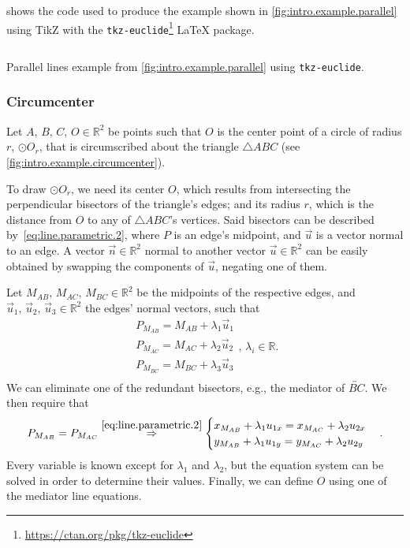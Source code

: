  shows the code used to produce the
example shown in \cref{fig:intro.example.parallel} using \acs{TikZ} with the
\texttt{tkz-euclide}\footnote{\url{https://ctan.org/pkg/tkz-euclide}} \LaTeX{}
package.

\begin{listing}[htb]
  \inputminted{latex}{tikz/ex-parallel.tikz}
  \caption[Parallel lines example using \texttt{tkz-euclide}]{
    Parallel lines example from \cref{fig:intro.example.parallel} using
    \texttt{tkz-euclide}.}%
  \label{lst:intro.example.parallel.tikz}
\end{listing}

\subsubsection{Circumcenter}%
\label{sec:intro.examples.circumcenter}

Let $A,\,B,\,C,\,O \in \mathbb{R}^2$ be points such that $O$ is the center point
of a circle of radius $r$, $\odot O_r$, that is circumscribed about the triangle
$\triangle ABC$ (see \cref{fig:intro.example.circumcenter}).

To draw $\odot O_r$, we need its center $O$, which results from intersecting the
perpendicular bisectors of the triangle's edges; and its radius $r$, which is
the distance from $O$ to any of $\triangle ABC$'s vertices.  Said bisectors can
be described by~\cref{eq:line.parametric.2}, where $P$ is an edge's midpoint,
and $\vec{u}$ is a vector normal to an edge.  A vector $\vec{n} \in
\mathbb{R}^2$ normal to another vector $\vec{u} \in \mathbb{R}^2$ can be easily
obtained by swapping the components of $\vec{u}$, negating one of them.

Let $M_{AB},\, M_{AC},\, M_{BC} \in \mathbb{R}^2$ be the midpoints of the
respective edges, and $\vec{u}_1,\,\vec{u}_2,\,\vec{u}_3 \in \mathbb{R}^2$ the
edges' normal vectors, such that
\[
  \begin{split}
    P_{M_{AB}} = M_{AB} + \lambda_1 \vec{u}_1 \\
    P_{M_{AC}} = M_{AC} + \lambda_2 \vec{u}_2 \\
    P_{M_{BC}} = M_{BC} + \lambda_3 \vec{u}_3 \\
  \end{split},\,\lambda_i \in \mathbb{R}.
\]
We can eliminate one of the redundant bisectors, e.g., the mediator of
$\overleftrightarrow{BC}$.  We then require that
\[
  P_{M_{AB}} = P_{M_{AC}} \stackrel{\eqref{eq:line.parametric.2}}{\Rightarrow}
  \begin{cases}
    x_{M_{AB}} + \lambda_1 u_{1x} = x_{M_{AC}} + \lambda_2 u_{2x} \\
    y_{M_{AB}} + \lambda_1 u_{1y} = y_{M_{AC}} + \lambda_2 u_{2y} \\
  \end{cases}.
\]
Every variable is known except for $\lambda_1$ and $\lambda_2$, but the equation
system can be solved in order to determine their values.  Finally, we can define
$O$ using one of the mediator line equations.

